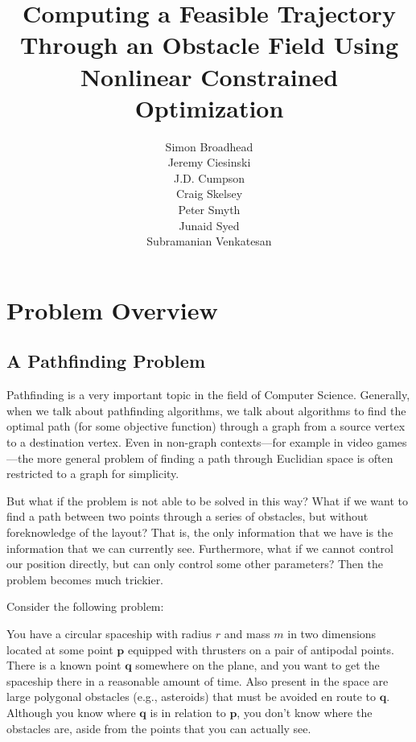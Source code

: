 \documentclass{report}
\begin{document}
\title{Computing a Feasible Trajectory Through an Obstacle Field Using Nonlinear Constrained Optimization}
\author{
    Simon Broadhead\\
    Jeremy Ciesinski\\
    J.D. Cumpson\\
    Craig Skelsey\\
    Peter Smyth\\
    Junaid Syed\\
    Subramanian Venkatesan
}
\maketitle

\tableofcontents

\chapter{Problem Overview}
\section{A Pathfinding Problem}
Pathfinding is a very important topic in the field of Computer Science.
Generally, when we talk about pathfinding algorithms, we talk about
algorithms to find the optimal path (for some objective function) through
a graph from a source vertex to a destination vertex. Even in
non-graph contexts---for example in video games---the more general problem
of finding a path through Euclidian space is often restricted to a graph
for simplicity.

But what if the problem is not able to be solved in this way? What if
we want to find a path between two points through a series of obstacles,
but without foreknowledge of the layout? That is, the only information
that we have is the information that we can currently see. Furthermore,
what if we cannot control our position directly, but can only control
some other parameters? Then the problem becomes much trickier.
\vspace{0.5em}

Consider the following problem:
\vspace{0.5em}

You have a circular spaceship with radius $r$ and mass $m$
in two dimensions located at some point $\mathbf{p}$ equipped with thrusters
on a pair of antipodal points. There
is a known point $\mathbf{q}$ somewhere on the plane, and you want to
get the spaceship there in a reasonable amount of time. Also present
in the space are large polygonal obstacles (e.g., asteroids) 
that must be avoided en route
to $\mathbf{q}$. Although you know where $\mathbf{q}$ is in relation to
$\mathbf{p}$, you don't know where the obstacles are, aside from the
points that you can actually see.
\end{document}
